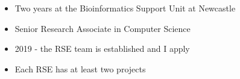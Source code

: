 \begin{frame}[t]
		\vspace{4\baselineskip}	
	\begin{itemize}
	\item Two years at the Bioinformatics Support Unit at Newcastle
	\item Senior Research Associate in Computer Science
	\item 2019 - the RSE team is established and I apply
	\item Each RSE has at least two projects

\end{itemize}

\end{frame}